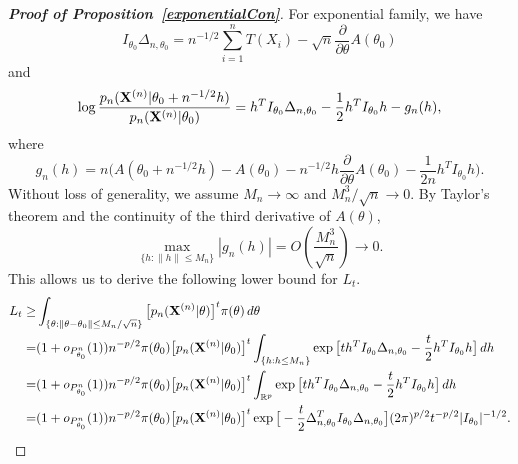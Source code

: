 \documentclass[11pt]{article}
\theoremstyle{plain}
\theoremstyle{definition}
\theoremstyle{remark}
\begin{document}
\begin{appendices}
\begin{proof}[\textbf{Proof of Proposition~\ref{exponentialCon}}]
    For exponential family, we have
    $$
    I_{\theta_0}\Delta_{n,\theta_0}=n^{-1/2}\sum_{i=1}^n T(X_i)-\sqrt{n}\frac{\partial}{\partial \theta} A(\theta_0)
    $$
    and
    $$
    \log\frac{p_n(\mathbf{X}^{(n)}|\theta_0+n^{-1/2}h)}{p_n(\mathbf{X}^{(n)}|\theta_0)}
    =h^T I_{\theta_0} \Delta_{n,\theta_0}-\frac{1}{2} h^T I_{\theta_0} h-
    g_n(h),
    $$
    where
    $$
    g_n(h)=n\Big(A(\theta_0+n^{-1/2}h)-A(\theta_0)-n^{-1/2}h \frac{\partial}{\partial \theta}A(\theta_0)-\frac{1}{2n}h^T I_{\theta_0}h\Big).
    $$
    Without loss of generality, we assume $M_n\to \infty$ and $M_n^3/\sqrt{n}\to 0$.
    By Taylor's theorem and the continuity of the third derivative of $A(\theta)$, 
    $$
        \max_{\{h:\|h\|\leq M_n\}}|g_n(h)|=O\left(\frac{M_n^3}{\sqrt{n}}\right)\to 0.
    $$
    This allows us to derive the following lower bound for $L_t$.
\begin{align*}
    L_t
    \geq &
    \int_{\{\theta:\|\theta-\theta_0\|\leq M_n/\sqrt{n}\}} \big[p_n(\mathbf{X}^{(n)}|\theta)\big]^t \pi(\theta)\, d\theta
    \\
    =&
    (1+o_{P_{\theta_0}^n}(1))n^{-p/2}\pi(\theta_0)\big[p_n(\mathbf{X}^{(n)}|\theta_0)\big]^t\int_{\{h:h\leq M_n\}} \exp\big[ t h^T I_{\theta_0}\Delta_{n,\theta_0}-\frac{t}{2}h^T I_{\theta_0}h\big] \, dh
    \\
    =&
    (1+o_{P_{\theta_0}^n}(1))n^{-p/2}\pi(\theta_0) \big[p_n(\mathbf{X}^{(n)}|\theta_0)\big]^t\int_{\mathbb{R}^p} \exp\big[t h^T I_{\theta_0}\Delta_{n,\theta_0}-\frac{t}{2}h^T I_{\theta_0}h\big] \, dh
    \\
    =&
    (1+o_{P_{\theta_0}^n}(1))n^{-p/2}\pi(\theta_0)\big[p_n(\mathbf{X}^{(n)}|\theta_0)\big]^t
    \exp\big[-\frac{t}{2}\Delta_{n,\theta_0}^T I_{\theta_0}\Delta_{n,\theta_0}\big]
    (2\pi)^{p/2} t^{-p/2}  |I_{\theta_0}|^{-1/2}.
\end{align*}


\end{proof}
\end{appendices}
\end{document}
